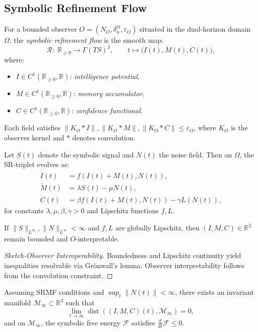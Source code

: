 \subsection*{Symbolic Refinement Flow}
\label{subsec:bk8_symbolic_refinement_flow}
\begin{definition}[SR-Triplet]
\label{definition:bk8_sr_triplet}
For a bounded observer \( O = (N_O, \delta^O_n, \varepsilon_O) \) situated in the dual-horizon domain \( \Omega \), the \emph{symbolic refinement flow} is the smooth map:
\[
\mathcal{R}:\;\mathbb{R}_{\geq 0} \to \Gamma(TS)^3, \qquad t \mapsto \bigl( \dot{I}(t), \dot{M}(t), \dot{C}(t) \bigr),
\]
where:
\begin{itemize}
  \item \( I \in C^1(\mathbb{R}_{\geq 0}, \mathbb{R}) \): \emph{intelligence potential},
  \item \( M \in C^1(\mathbb{R}_{\geq 0}, \mathbb{R}) \): \emph{memory accumulator},
  \item \( C \in C^1(\mathbb{R}_{\geq 0}, \mathbb{R}) \): \emph{confidence functional}.
\end{itemize}
Each field satisfies \( \| K_O * I \|, \| K_O * M \|, \| K_O * C \| \leq \varepsilon_O \), where \( K_O \) is the observer kernel and \( * \) denotes convolution.
\end{definition}
\begin{axiom}
\label{axiom:bk8_surface_energy_dynamics}
Let \( S(t) \) denote the symbolic signal and \( N(t) \) the noise field. Then on \( \Omega \), the SR-triplet evolves as:
\[
\begin{aligned}
\dot{I}(t) &= f(I(t)+M(t), N(t)), \\
\dot{M}(t) &= \lambda S(t) - \mu N(t), \\
\dot{C}(t) &= \beta f(I(t)+M(t), N(t)) - \gamma L(N(t)),
\end{aligned}
\]
for constants \( \lambda, \mu, \beta, \gamma > 0 \) and Lipschitz functions \( f, L \).
\end{axiom}
\begin{proposition}[Boundedness]
\label{prop:bk8_genetic_symbolic_resonance}
If \( \|S\|_{L^\infty}, \|N\|_{L^\infty} < \infty \) and \( f, L \) are globally Lipschitz, then \( (I, M, C) \in \mathbb{R}^3 \) remain bounded and $O$-interpretable.
\end{proposition}
\begin{proof}[Sketch-Observer Interoperability]
\label{proof:bk8_sketch_observer_interoperability}
Boundedness and Lipschitz continuity yield inequalities resolvable via Grönwall’s lemma. Observer interpretability follows from the convolution constraint.
\end{proof}
\begin{theorem}[SR Convergence]
\label{theorem:bk8_sr_convergence}
Assuming SRMF conditions and \( \sup_t \| N(t) \| < \infty \), there exists an invariant manifold \( \mathcal{M}_\infty \subset \mathbb{R}^3 \) such that
\[
\lim_{t \to \infty} \operatorname{dist}((I, M, C)(t), \mathcal{M}_\infty) = 0,
\]
and on \( \mathcal{M}_\infty \), the symbolic free energy \( \mathcal{F} \) satisfies \( \frac{d}{dt} \mathcal{F} \leq 0 \).
\end{theorem}
